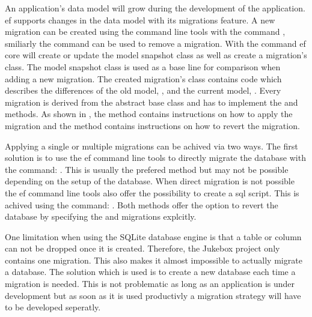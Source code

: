 
An application's data model will grow during the development of the application. \gls{ef} supports changes in the data model with its migrations feature. A new migration can be created using the command line tools with the command , smiliarly the  command can be used to remove a migration. With the  command \gls{ef} core will create or update the model snapshot class as well as create a migration's class. The model snapshot class is used as a base line for comparison when adding a new migration. The created migration's class contains code which describes the differences of the old model, , and the current model, . Every migration is derived from the abstract base class  and has to implement the  and  methods. As shown in , the  method contains instructions on how to apply the migration and the  method contains instructions on how to revert the migration. \cite{efMigrations}

Applying a single or multiple migrations can be achived via two ways. The first solution is to use the \gls{ef} command line tools to directly migrate the database with the command: . This is usually the prefered method but may not be possible depending on the setup of the database. When direct migration is not possible the \gls{ef} command line tools also offer the possibility to create a \gls{sql} script. This is achived using the command: . Both methods offer the option to revert the database by specifying the  and  migrations explcitly.

One limitation when using the SQLite database engine is that a table or column can not be dropped once it is created. Therefore, the Jukebox project only contains one migration. This also makes it almost impossible to actually migrate a database. The solution which is used is to create a new database each time a migration is needed. This is not problematic as long as an application is under development but as soon as it is used productivly a migration strategy will have to be developed seperatly.



